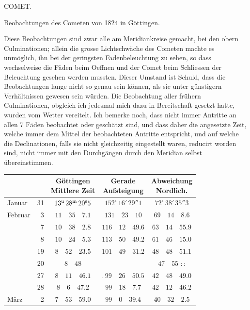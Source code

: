 \par{}\bigskip
\hypertarget{native-455-comet}{}
\begin{center}
{\large COMET.}
\end{center}


\begin{center}
Beobachtungen des Cometen von 1824 in Göttingen.
\end{center}

Diese Beobachtungen sind zwar alle am Meridiankreise gemacht, bei den obern
Culminationen; allein die grosse Lichtschwäche des Cometen machte es
unmöglich, ihn bei der geringsten Fadenbeleuchtung zu sehen, so dass
wechselweise die Fäden beim Oeffnen und der Comet beim Schliessen der
Beleuchtung gesehen werden mussten. Dieser Umstand ist Schuld, dass die
Beobachtungen lange nicht so genau sein können, als sie unter günstigern
Verhältnissen gewesen sein würden. Die Beobachtung aller frühern
Culminationen, obgleich ich jedesmal mich dazu in Bereitschaft gesetzt hatte,
wurden vom Wetter vereitelt. Ich bemerke noch, dass nicht immer Antritte an
allen 7 Fäden beobachtet oder geschätzt sind, und dass daher die angesetzte
Zeit, welche immer dem Mittel der beobachteten Antritte entspricht, und auf
welche die Declinationen, falls sie nicht gleichzeitig eingestellt waren,
reducirt worden sind, nicht immer mit den Durchgängen durch den Meridian
selbst übereinstimmen.

\begin{center}
\begingroup\small\setlength{\tabcolsep}{4pt}
\begin{tabular}{lr|c|c|c}
\multicolumn{2}{c|}{} & \shortstack{Göttingen\\Mittlere Zeit} & \shortstack{Gerade\\Aufsteigung} & \shortstack{Abweichung\\Nordlich.} \\
\hline
Januar & 31 & $13^{\rm u}\,28^{\rm m}\,20^{\rm s}5$ & $152^{\circ}\,16'\,29''1$ & $72^{\circ}\,38'\,35''3$ \\
Februar & 3 & $11\quad35\quad7.1$ & $131\quad23\quad10$ & $69\quad14\quad8.6$ \\
 & 7 & $10\quad38\quad2.8$ & $116\quad12\quad49.6$ & $63\quad14\quad55.9$ \\
 & 8 & $10\quad24\quad5.3$ & $113\quad50\quad49.2$ & $61\quad46\quad15.0$ \\
 & 19 & $8\quad52\quad23.5$ & $101\quad49\quad31.2$ & $48\quad48\quad51.1$ \\
 & 20 & $8\quad48$ &  & $47\quad55$ \quad :\,: \\
 & 27 & $8\quad11\quad46.1$ & .\,$99\quad26\quad50.5$ & $42\quad48\quad49.0$ \\
 & 28 & $8\quad6\quad47.2$ & $99\quad18\quad7.7$ & $42\quad12\quad46.2$ \\
März & 2 & $7\quad53\quad59.0$ & $99\quad0\quad39.4$ & $40\quad32\quad2.5$ \\
\end{tabular}
\endgroup
\end{center}


